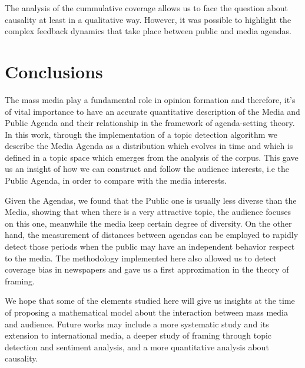 \documentclass{bmcart}
\begin{document}
\par The analysis of the cummulative coverage allows us to face the question about causality at least in a qualitative way.
However, it was possible to highlight the complex feedback dynamics that take place between public and media agendas.

\section*{Conclusions}

\par The mass media play a fundamental role in opinion formation and therefore, it's of vital importance to have an accurate  quantitative description of the Media  and Public Agenda and their relationship in the framework of agenda-setting theory.
In this work, through the implementation of a topic detection algorithm we describe the Media Agenda as a distribution which evolves in time and which is defined in a topic space which emerges from the analysis of the corpus. This gave us an insight of how we can construct and follow the audience interests, i.e the Public Agenda, in order to compare with the media interests. 

\par Given the Agendas, we found that the Public one is usually less diverse than the Media, showing that when there is a very attractive topic, the audience focuses on this one, meanwhile the media keep certain degree of diversity. 
On the other hand, the measurement of distances between agendas can be employed to rapidly detect those periods when the public may have an independent behavior respect to the media. The methodology implemented here also allowed us to detect coverage bias in newspapers and gave us a first approximation in the theory of framing. 
\par We hope that some of the elements studied here will give us insights at the time of proposing a mathematical model about the interaction between mass media and audience. Future works may include a more systematic study and its extension to international media, a deeper study of framing through topic detection and sentiment analysis, and a more quantitative analysis about causality.
\end{document}
